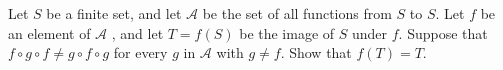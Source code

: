 Let 
$S$
 be a finite set, and let 
$\mathcal{A}$
 be the set of all functions from 
$S$
 to 
$S$.
Let 
$f$
 be an element of 
$\mathcal{A}$
,
 and let 
$T=f(S)$
 be the image of 
$S$
 under 
$f$.
 Suppose that 
$f\circ g\circ f\ne g\circ f\circ g$
 for every 
$g$
 in 
$\mathcal{A}$
 with 
$g\ne f$.
 Show that 
$f(T)=T$.
